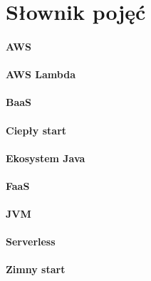 \chapter*{Słownik pojęć}

\subsubsection*{AWS}

\subsubsection*{AWS Lambda}

\subsubsection*{BaaS}

\subsubsection*{Ciepły start}

\subsubsection*{Ekosystem Java}

\subsubsection*{FaaS}

\subsubsection*{JVM}

\subsubsection*{Serverless}

\subsubsection*{Zimny start}
